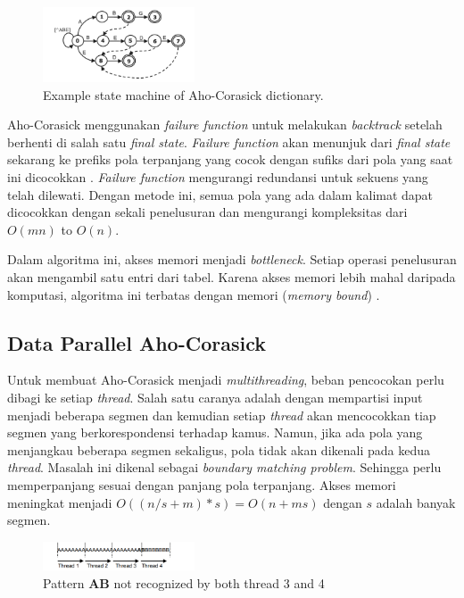 \documentclass[conference]{IEEEtran}
\begin{document}
    \begin{figure}[htbp]
        \centerline{\includegraphics[width=0.4\textwidth]{../src/resources/aho-c.png}}
        \caption{Example state machine of Aho-Corasick dictionary.}
    \end{figure}

    Aho-Corasick menggunakan \emph{failure function} untuk melakukan \emph{backtrack} setelah berhenti di salah satu \emph{final state}. \emph{Failure function} akan menunjuk dari \emph{final state} sekarang ke prefiks pola terpanjang yang cocok dengan sufiks dari pola yang saat ini dicocokkan \cite{ahoc1975}. \emph{Failure function} mengurangi redundansi untuk sekuens yang telah dilewati. Dengan metode ini, semua pola yang ada dalam kalimat dapat dicocokkan dengan sekali penelusuran dan mengurangi kompleksitas dari $O(mn)$ to $O(n)$. 

    Dalam algoritma ini, akses memori menjadi \emph{bottleneck}. Setiap operasi penelusuran akan mengambil satu entri dari tabel. Karena akses memori lebih mahal daripada komputasi, algoritma ini terbatas dengan memori (\emph{memory bound}) \cite{lin2013}.

    \subsection{Data Parallel Aho-Corasick}
    Untuk membuat Aho-Corasick menjadi \emph{multithreading}, beban pencocokan perlu dibagi ke setiap \emph{thread}. Salah satu caranya adalah dengan mempartisi input menjadi beberapa segmen dan kemudian setiap \emph{thread} akan mencocokkan tiap segmen yang berkorespondensi terhadap kamus. Namun, jika ada pola yang menjangkau beberapa segmen sekaligus, pola tidak akan dikenali pada kedua \emph{thread}. Masalah ini dikenal sebagai \emph{boundary matching problem}. Sehingga perlu memperpanjang sesuai dengan panjang pola terpanjang. Akses memori meningkat menjadi $O((n/s + m) * s) = O(n + ms)$ dengan $s$ adalah banyak segmen. 

    \begin{figure}[htbp]
        \centerline{\includegraphics[width=0.4\textwidth]{../src/resources/boundary.png}}
        \caption{Pattern \textbf{AB} not recognized by both thread 3 and 4}
    \end{figure}
\end{document}
